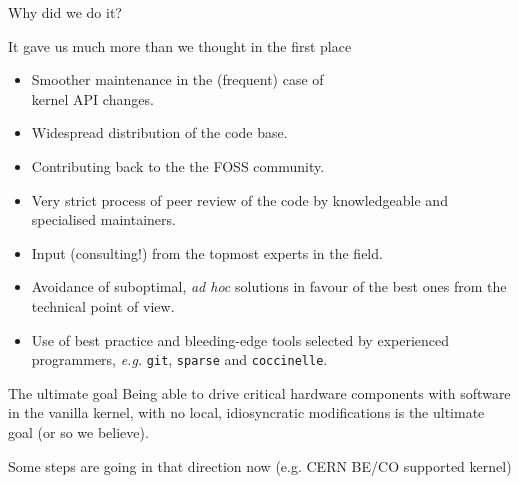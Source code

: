 \documentclass[compress,red]{beamer}
\begin{document}
\begin{frame}{Why did we do it?}

It gave us much more than we thought in the first place
\begin{itemize}
\pause
\item Smoother maintenance in the (frequent) case of\\
	kernel API changes.
\item Widespread distribution of the code base.
\item Contributing back to the the FOSS community.
\pause \color{red}
\item Very strict process of peer review of the code by knowledgeable
    and specialised maintainers.
\pause
\item Input (consulting!) from the topmost experts in the field.
\pause
\item Avoidance of suboptimal, \emph{ad hoc} solutions in favour of the
    best ones from the technical point of view.
\pause
\item Use of best practice and bleeding-edge tools selected by
    experienced programmers, \emph{e.g.} \texttt{git}, \texttt{sparse}
    and \texttt{coccinelle}.
\end{itemize}
\end{frame}

\begin{frame}{The ultimate goal}
    Being able to drive critical hardware components with software
    in the vanilla kernel, with no local, idiosyncratic modifications
    is the ultimate goal (or so we believe).

    Some steps are going in that direction now (e.g. CERN BE/CO
    supported kernel)
\end{frame}
\end{document}
